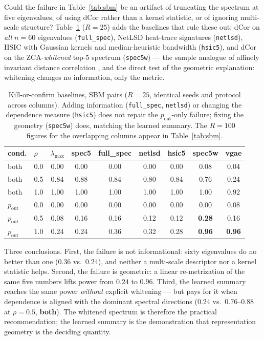 \documentclass[11pt]{article}
\begin{document}
Could the failure in Table~\ref{tab:sbm} be an artifact of truncating the
spectrum at five eigenvalues, of using dCor rather than a kernel statistic, or
of ignoring multi-scale structure? Table~\ref{tab:d2b} ($R = 25$) adds the
baselines that rule these out: dCor on \emph{all} $n = 60$ eigenvalues
(\texttt{full\_spec}), NetLSD heat-trace signatures \citep{tsitsulin2018netlsd}
(\texttt{netlsd}), HSIC with Gaussian kernels and median-heuristic bandwidth
(\texttt{hsic5}), and dCor on the ZCA-\emph{whitened} top-5 spectrum
(\texttt{spec5w}) --- the sample analogue of affinely invariant distance
correlation \citep{dueck2014affinely}, and the direct test of the geometric
explanation: whitening changes no information, only the metric.

\begin{table}[ht]
\centering
\caption{Kill-or-confirm baselines, SBM pairs ($R = 25$, identical seeds and
protocol across columns). Adding information (\texttt{full\_spec},
\texttt{netlsd}) or changing the dependence measure (\texttt{hsic5}) does not
repair the $p_{\mathrm{out}}$-only failure; fixing the geometry
(\texttt{spec5w}) does, matching the learned summary. The $R = 100$ figures for
the overlapping columns appear in Table~\ref{tab:sbm}.}
\label{tab:d2b}
\begin{tabular}{llccccccc}
\toprule
cond. & $\rho$ & $\lambda_{\max}$ & spec5 & full\_spec & netlsd & hsic5 & spec5w & vgae \\
\midrule
both        & 0.0 & 0.00 & 0.00 & 0.00 & 0.00 & 0.00 & 0.08 & 0.04 \\
both        & 0.5 & 0.84 & 0.88 & 0.84 & 0.80 & 0.84 & 0.76 & 0.24 \\
both        & 1.0 & 1.00 & 1.00 & 1.00 & 1.00 & 1.00 & 1.00 & 0.92 \\
\addlinespace
$p_{\mathrm{out}}$ & 0.0 & 0.00 & 0.00 & 0.00 & 0.00 & 0.00 & 0.00 & 0.08 \\
$p_{\mathrm{out}}$ & 0.5 & 0.08 & 0.16 & 0.16 & 0.12 & 0.12 & \textbf{0.28} & 0.16 \\
$p_{\mathrm{out}}$ & 1.0 & 0.24 & 0.24 & 0.36 & 0.32 & 0.28 & \textbf{0.96} & \textbf{0.96} \\
\bottomrule
\end{tabular}
\end{table}

Three conclusions. First, the failure is not informational: sixty eigenvalues
do no better than one ($0.36$ vs.\ $0.24$), and neither a multi-scale
descriptor nor a kernel statistic helps. Second, the failure is geometric: a
linear re-metrization of the same five numbers lifts power from $0.24$ to
$0.96$. Third, the learned summary reaches the same power \emph{without}
explicit whitening --- but pays for it when dependence is aligned with the
dominant spectral directions ($0.24$ vs.\ $0.76$--$0.88$ at $\rho = 0.5$,
\textbf{both}). The whitened spectrum is therefore the practical
recommendation; the learned summary is the demonstration that representation
geometry is the deciding quantity.
\end{document}
